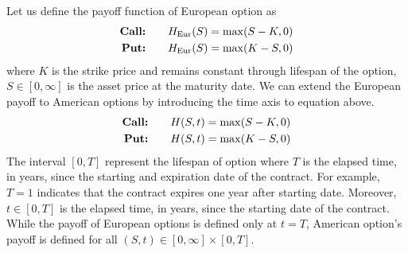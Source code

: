 Let us define the payoff function of European option as
\begin{subequations}
  \begin{align}
    \text{\textbf{Call:}} \qquad H_{\text{Eur}}(S) = \max(S - K, 0) \\
    \text{\textbf{Put:}} \qquad H_{\text{Eur}}(S) = \max(K - S, 0)
  \end{align}
  \label{eq:blackscholes:preliminaries:european_put_payoff}
\end{subequations}
where $K$ is the strike price and remains constant through lifespan of the option,
$S \in [0, \infty]$ is the asset price at the maturity date. We can extend the European payoff to American options by introducing
the time axis to equation above.
\begin{subequations}
  \begin{align}
    \text{\textbf{Call:}} \qquad H(S, t) = \max(S - K, 0) \\
    \text{\textbf{Put:}} \qquad H(S,t) = \max(K - S, 0)
  \end{align}
  \label{eq:blackscholes:preliminaries:american_put_payoff}
\end{subequations}
The interval $[0, T]$ represent the lifespan of option where $T$ is the elapsed time, in years, since the starting and expiration date of the contract. For example, $T=1$ indicates that the contract expires one year after starting date. Moreover, $t\in[0, T]$ is the elapsed time, in years, since the starting date of the contract. While the payoff of European options is defined only at $t=T$, American option's payoff is defined for all $(S, t) \in [0, \infty]\times[0, T]$.

